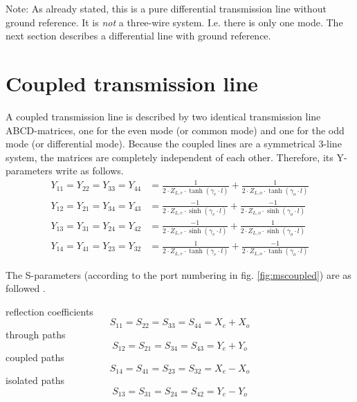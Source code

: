 Note: As already stated, this is a pure differential transmission line
without ground reference. It is \textit{not} a three-wire system. I.e.
there is only one mode. The next section describes a differential line
with ground reference.


\section{Coupled transmission line}
\label{sec:coupledtline}

A coupled transmission line is described by two identical transmission
line ABCD-matrices, one for the even mode (or common mode) and one
for the odd mode (or differential mode).
Because the coupled lines are a symmetrical 3-line system, the
matrices are completely independent of each other.  Therefore, its
Y-parameters write as follows.
\begin{align}
Y_{11} = Y_{22} = Y_{33} = Y_{44} &= \frac{1}{2\cdot Z_{L,e} \cdot \tanh\left(\gamma_e\cdot l\right)}
              + \frac{1}{2\cdot Z_{L,o} \cdot \tanh\left(\gamma_o\cdot l\right)}\\
Y_{12} = Y_{21} = Y_{34} = Y_{43} &= \frac{-1}{2\cdot Z_{L,e} \cdot \sinh\left(\gamma_e\cdot l\right)}
              + \frac{-1}{2\cdot Z_{L,o} \cdot \sinh\left(\gamma_o\cdot l\right)}\\
Y_{13} = Y_{31} = Y_{24} = Y_{42} &= \frac{-1}{2\cdot Z_{L,e} \cdot \sinh\left(\gamma_e\cdot l\right)}
              + \frac{1}{2\cdot Z_{L,o} \cdot \sinh\left(\gamma_o\cdot l\right)}\\
Y_{14} = Y_{41} = Y_{23} = Y_{32} &= \frac{1}{2\cdot Z_{L,e} \cdot \tanh\left(\gamma_e\cdot l\right)}
              + \frac{-1}{2\cdot Z_{L,o} \cdot \tanh\left(\gamma_o\cdot l\right)}
\end{align}

The S-parameters (according to the port numbering in
fig. \ref{fig:mscoupled}) are as followed \cite{Edwards}.

\addvspace{12pt}

reflection coefficients
\begin{equation}
S_{11} = S_{22} = S_{33} = S_{44} = X_e + X_o
\end{equation}
through paths
\begin{equation}
S_{12} = S_{21} = S_{34} = S_{43} = Y_e + Y_o
\end{equation}
coupled paths
\begin{equation}
S_{14} = S_{41} = S_{23} = S_{32} = X_e - X_o
\end{equation}
isolated paths
\begin{equation}
S_{13} = S_{31} = S_{24} = S_{42} = Y_e - Y_o
\end{equation}


